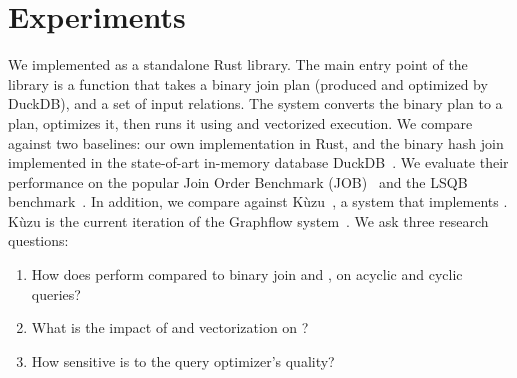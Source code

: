 \section{Experiments}\label{sec:eval}


We implemented \FJ as a standalone Rust library.  The main entry point
of the library is a function that takes a binary join plan (produced
and optimized by DuckDB), and a set of input relations.  The system
converts the binary plan to a \FJ plan, optimizes it, then runs it
using \COLT and vectorized execution.
We compare \FJ against two baselines: our own \GJ implementation in
Rust, and the binary hash join implemented in the state-of-art
in-memory database
DuckDB~\cite{DBLP:conf/cidr/RaasveldtM20,DBLP:conf/vldb/Raasveldt22}.
We evaluate their performance on the popular Join Order Benchmark
(JOB)~\cite{DBLP:journals/pvldb/LeisGMBK015} and the LSQB
benchmark~\cite{DBLP:conf/sigmod/MhedhbiLKWS21}.  
In addition, we compare against K\`uzu~\cite{kuzu:cidr}, 
 a system that implements \GJ.
K\`uzu is the current iteration of the Graphflow system~\cite{DBLP:journals/pvldb/MhedhbiS19}.
We ask three research questions:
\begin{enumerate}
    \item How does \FJ perform compared to binary join and \GJ, on acyclic and cyclic queries?
    \item What is the impact of \COLT and vectorization on \FJ?
    \item How sensitive is \FJ to the query optimizer's quality?
\end{enumerate}


